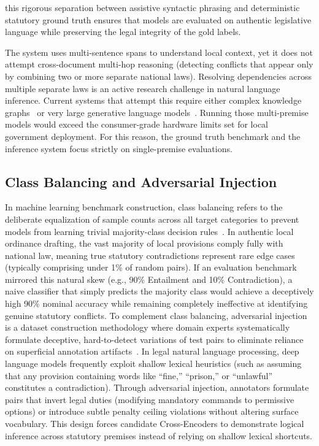 this rigorous separation between assistive syntactic phrasing and deterministic statutory ground truth ensures that models are evaluated on authentic legislative language while preserving the legal integrity of the gold labels.

    The system uses multi-sentence spans to understand local context, yet it does not attempt cross-document multi-hop reasoning (detecting conflicts that appear only by combining two or more separate national laws). Resolving dependencies across multiple separate laws is an active research challenge in natural language inference. Current systems that attempt this require either complex knowledge graphs~\cite{lu2023multi} or very large generative language models~\cite{shen2025hopweaver}. Running those multi-premise models would exceed the consumer-grade hardware limits set for local government deployment. For this reason, the ground truth benchmark and the inference system focus strictly on single-premise evaluations.

    \subsection{Class Balancing and Adversarial Injection}
    \label{sec:class_balancing}
    In machine learning benchmark construction, class balancing refers to the deliberate equalization of sample counts across all target categories to prevent models from learning trivial majority-class decision rules~\cite{chawla2002smote}. In authentic local ordinance drafting, the vast majority of local provisions comply fully with national law, meaning true statutory contradictions represent rare edge cases (typically comprising under 1\% of random pairs). If an evaluation benchmark mirrored this natural skew (e.g., 90\% Entailment and 10\% Contradiction), a naive classifier that simply predicts the majority class would achieve a deceptively high 90\% nominal accuracy while remaining completely ineffective at identifying genuine statutory conflicts. To complement class balancing, adversarial injection is a dataset construction methodology where domain experts systematically formulate deceptive, hard-to-detect variations of test pairs to eliminate reliance on superficial annotation artifacts~\cite{gururangan2018annotation, poliak2018hypothesis}. In legal natural language processing, deep language models frequently exploit shallow lexical heuristics (such as assuming that any provision containing words like ``fine,'' ``prison,'' or ``unlawful'' constitutes a contradiction). Through adversarial injection, annotators formulate pairs that invert legal duties (modifying mandatory commands to permissive options) or introduce subtle penalty ceiling violations without altering surface vocabulary. This design forces candidate Cross-Encoders to demonstrate logical inference across statutory premises instead of relying on shallow lexical shortcuts.

